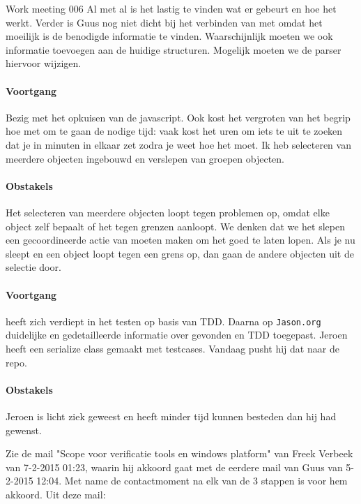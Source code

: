 \documentclass[a4paper,final]{article}
\begin{document}
\begin{Minutes}{Work meeting 006}
Al met al is het lastig te vinden wat er gebeurt en hoe het werkt. Verder is Guus nog 
niet dicht bij het verbinden van \xmv met \xmd omdat het moeilijk is de benodigde informatie
te vinden. Waarschijnlijk moeten we ook informatie toevoegen aan de huidige structuren.
Mogelijk moeten we de parser hiervoor wijzigen.


\paragraph{Voortgang} Bezig met het opkuisen van de javascript. Ook kost het
vergroten van het begrip hoe met \qml om te gaan de nodige tijd: vaak kost het uren
om iets te uit te zoeken dat je in minuten in elkaar zet zodra je weet hoe het moet.
Ik heb selecteren van meerdere objecten ingebouwd en verslepen van groepen objecten.

\paragraph{Obstakels} Het selecteren van meerdere objecten loopt tegen problemen
op, omdat elke object zelf bepaalt of het tegen grenzen aanloopt. We denken dat we het
slepen een gecoordineerde actie van  moeten maken om het goed te laten lopen.
Als je nu sleept en een object loopt tegen een grens op, dan gaan de andere objecten 
uit de selectie door.


\paragraph{Voortgang} heeft zich verdiept in het testen op basis van TDD. Daarna op 
\texttt{Jason.org} duidelijke en gedetailleerde informatie over  gevonden 
en TDD toegepast. Jeroen heeft een serialize class gemaakt met testcases. 
Vandaag pusht hij dat naar de repo.

\paragraph{Obstakels} Jeroen is licht ziek geweest en heeft minder tijd kunnen besteden 
dan hij had gewenst. 


Zie de mail "Scope voor verificatie tools en windows platform"
van Freek Verbeek van 7-2-2015 01:23, waarin hij akkoord gaat met de eerdere mail van Guus van
5-2-2015 12:04. Met name de contactmoment na elk van de 3 stappen is voor hem akkoord. Uit 
deze mail:


\end{Minutes}
\end{document}
